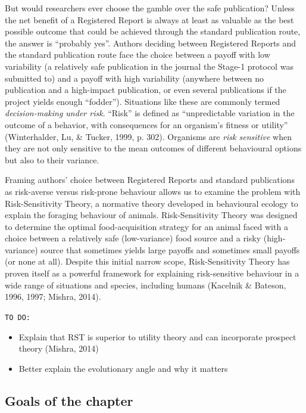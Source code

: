 \documentclass[british,,doc,mask,floatsintext]{apa6}
\providecommand{\tightlist}{%
  \setlength{\itemsep}{0pt}\setlength{\parskip}{0pt}}
\begin{document}
But would researchers ever choose the gamble over the safe publication?
Unless the net benefit of a Registered Report is always at least as valuable as the best possible outcome that could be achieved through the standard publication route, the answer is \enquote{probably yes}.
Authors deciding between Registered Reports and the standard publication route face the choice between a payoff with low variability (a relatively safe publication in the journal the Stage-1 protocol was submitted to) and a payoff with high variability (anywhere between no publication and a high-impact publication, or even several publications if the project yields enough \enquote{fodder}).
Situations like these are commonly termed \emph{decision-making under risk}.
\enquote{Risk} is defined as \enquote{unpredictable variation in the outcome of a behavior, with consequences for an organism's fitness or utility} (Winterhalder, Lu, \& Tucker, 1999, p. 302).
Organisms are \emph{risk sensitive} when they are not only sensitive to the mean outcomes of different behavioural options but also to their variance.

Framing authors' choice between Registered Reports and standard publications as risk-averse versus risk-prone behaviour allows us to examine the problem with Risk-Sensitivity Theory, a normative theory developed in behavioural ecology to explain the foraging behaviour of animals.
Risk-Sensitivity Theory was designed to determine the optimal food-acquisition strategy for an animal faced with a choice between a relatively safe (low-variance) food source and a risky (high-variance) source that sometimes yields large payoffs and sometimes small payoffs (or none at all).
Despite this initial narrow scope, Risk-Sensitivity Theory has proven itself as a powerful framework for explaining risk-sensitive behaviour in a wide range of situations and species, including humans (Kacelnik \& Bateson, 1996, 1997; Mishra, 2014).

\texttt{TO\ DO:}

\begin{itemize}
\tightlist
\item
  Explain that RST is superior to utility theory and can incorporate prospect theory (Mishra, 2014)
\item
  Better explain the evolutionary angle and why it matters
\end{itemize}

\hypertarget{goals-of-the-chapter}{%
\subsection{Goals of the chapter}\label{goals-of-the-chapter}}
\end{document}
